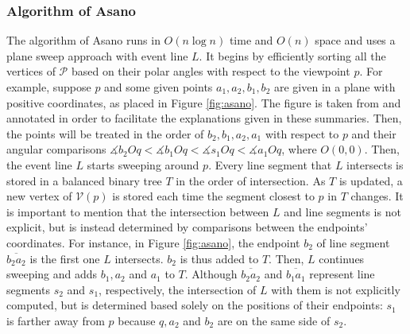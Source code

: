 
\subsubsection{Algorithm of Asano \cite{asano1985efficient}}
The algorithm of Asano \cite{asano1985efficient} runs in $O(n \log n)$ time and $O(n)$ space and uses a plane sweep approach with event line $L$. It begins by efficiently sorting all the vertices of $\mathcal P$ based on their polar angles with respect to the viewpoint $p$. For example, suppose $p$ and some given points $a_1, a_2, b_1, b_2$ are given in a plane with positive coordinates, as placed in Figure \ref{fig:asano}. The figure is taken from \cite{DBLP:journals/corr/BungiuHHHK14} and annotated in order to facilitate the explanations given in these summaries. Then, the points will be treated in the order of $b_2, b_1, a_2, a_1$ with respect to $p$ and their angular comparisons $\measuredangle b_2Oq < \measuredangle b_1Oq < \measuredangle s_1Oq < \measuredangle a_1Oq$, where $O(0, 0)$. Then, the event line $L$ starts sweeping around $p$. Every line segment that $L$ intersects is stored in a balanced binary tree $T$ in the order of intersection. As $T$ is updated, a new vertex of $\mathcal V(p)$ is stored each time the segment closest to $p$ in $T$ changes. It is important to mention that the intersection between $L$ and line segments is not explicit, but is instead determined by comparisons between the endpoints' coordinates. For instance, in Figure \ref{fig:asano}, the endpoint $b_2$ of line segment $\overline{b_2a_2}$ is the first one $L$ intersects. $b_2$ is thus added to $T$. Then, $L$ continues sweeping and adds $b_1, a_2$ and $a_1$ to $T$. Although $\overline{b_2a_2}$ and $\overline{b_1a_1}$ represent line segments $s_2$ and $s_1$, respectively, the intersection of $L$ with them is not explicitly computed, but is determined based solely on the positions of their endpoints: $s_1$ is farther away from $p$ because $q, a_2$ and $b_2$ are on the same side of $s_2$.

